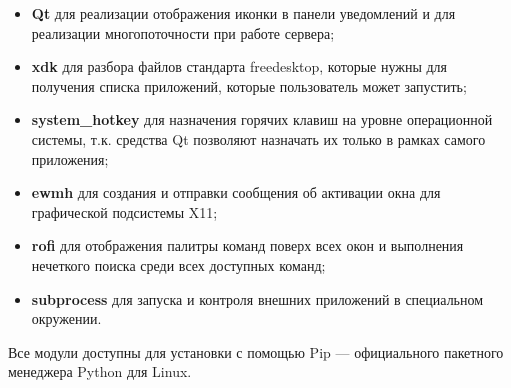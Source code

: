 \begin{itemize}
	\item \textbf{Qt} для реализации отображения иконки в панели уведомлений
		и для реализации многопоточности при работе сервера;
	\item \textbf{xdk} для разбора файлов стандарта freedesktop, которые нужны
		для получения списка приложений, которые пользователь может запустить;
	\item \textbf{system\_hotkey} для назначения горячих клавиш на уровне
		операционной системы, т.к. средства Qt позволяют назначать их только
		в рамках самого приложения;
	\item \textbf{ewmh} для создания и отправки сообщения об активации окна для
		графической подсистемы X11;
	\item \textbf{rofi} для отображения палитры команд поверх всех окон и
		выполнения нечеткого поиска среди всех доступных команд;
	\item \textbf{subprocess} для запуска и контроля внешних приложений в
		специальном окружении.
\end{itemize}

Все модули доступны для установки с помощью Pip — официального пакетного
менеджера Python для Linux.

